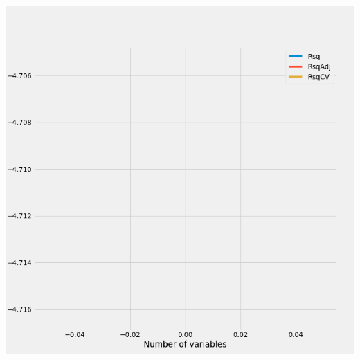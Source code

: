 \documentclass{article}
\begin{document}
	\includegraphics[scale = 0.2]{../plots/python/StepwisePCP.png}
	
\end{document}
